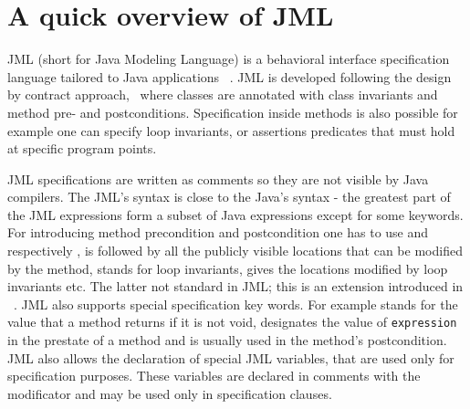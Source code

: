 \section{A quick overview of JML}\label{prelim}
JML (short for Java Modeling Language) is a behavioral interface specification language tailored to Java applications ~\cite{JMLRefMan}. JML is developed 
following the design by contract approach,~\cite{M97oos} where classes are annotated with class invariants and method pre- and postconditions. Specification
inside methods is also possible for example one can specify loop invariants, or assertions  predicates that must hold at specific program points. 

JML specifications are written as comments so they are not visible by Java compilers. The JML's syntax is close to the 
 Java's syntax - the greatest part of the JML expressions form a subset of Java expressions except for some keywords.
 For introducing method precondition and postcondition one has to use   and  respectively ,
   is followed by all the publicly visible locations that can be modified by the method, 
   stands for loop invariants,  gives  the locations modified by loop invariants etc. 
  The latter not standard in JML; this is an extension introduced in  ~\cite{BRL-JACK}. JML also supports special specification
  key words. For example  stands for the value that a method returns if it is not void,  
  designates the value of \texttt{expression} in the prestate of a method and is usually used in the method's postcondition. 
  JML also allows the declaration of special JML variables, that are used only for specification purposes. 
These variables are declared in comments with the  modificator and may be used only in specification clauses. 

